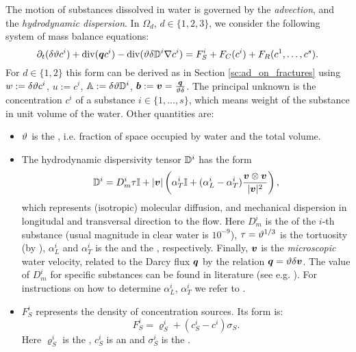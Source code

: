 The motion of substances dissolved in water is governed by the \emph{advection}, and the \emph{hydrodynamic dispersion}.
In $\Omega_d$, $d\in\{1,2,3\}$, we consider the following system of mass balance equations:
\begin{equation}
    \label{e:ADE}
   \partial_t ( \delta \th c^i) + \div ( \vc q c^i ) - \div (\th \delta \D^i \grad c^i ) = F_S^i + F_C(c^i) + F_R(c^1,\dots, c^s).
\end{equation}
For $d\in\{1,2\}$ this form can be derived as in Section \ref{sc:ad_on_fractures} using $w:=\delta\vartheta c^i$, $u:=c^i$, ${\mathbb{A}}:=\delta\vartheta{\mathbb{D}}^i$, $\mathbf{\boldsymbol{b}}:=\mathbf{\boldsymbol{v}}=\frac{\mathbf{\boldsymbol{q}}}{\vartheta\delta}$.
The principal unknown is the concentration $c^i$  of a substance $i\in\{1,\dots, s\}$, which means weight of the substance in unit volume of the water.
Other quantities are:
\begin{itemize}

\item $\vartheta$ \units{}{}{} is the , i.e. fraction of space occupied by water and the total volume.
\item The hydrodynamic dispersivity tensor ${{\mathbb{D}}}^i$  has the form
\begin{equation} 
  \label{eqn:transport_disp}
  \D^i =D_m^i \tau \tn I + \abs{\vc v}\left(\alpha_T^i \tn I + (\alpha_L^i - \alpha_T^i) \frac{\vc v \otimes \vc v}{\abs{\vc v}^2}\right),
\end{equation}
which represents (isotropic) molecular diffusion, and mechanical dispersion in longitudal and transversal direction to the flow.
Here $D_m^i$  is the  of the $i$-th substance (usual magnitude in clear water is $10^{-9}$), $\tau=\vartheta^{1/3}$ is the tortuosity (by \cite{millington_quirk}), $\alpha_L^i$  and $\alpha_T^i$  is the  and the , respectively.
Finally, $\mathbf{\boldsymbol{v}}$  is the \emph{microscopic} water velocity, related to the Darcy flux $\mathbf{\boldsymbol{q}}$ by the relation $\mathbf{\boldsymbol{q}} = \vartheta\delta\mathbf{\boldsymbol{v}}$.
The value of $D_m^i$ for specific substances can be found in literature (see e.g. \cite{cislerova_vogel}).
For instructions on how to determine $\alpha_L^i$, $\alpha_T^i$ we refer to \cite{marsily,domenico_schwartz}.

\item $F_S^i$  represents the density of concentration sources.
Its form is:
\begin{equation}
 F_S^i = \varrho^i_S + (c_S^i-c^i)\sigma_S. \label{eqn:transport_sources}
\end{equation}
Here $\varrho_S^i$  is the , $c_S^i$ is an  and $\sigma_S^i$ is the .


\end{itemize}
